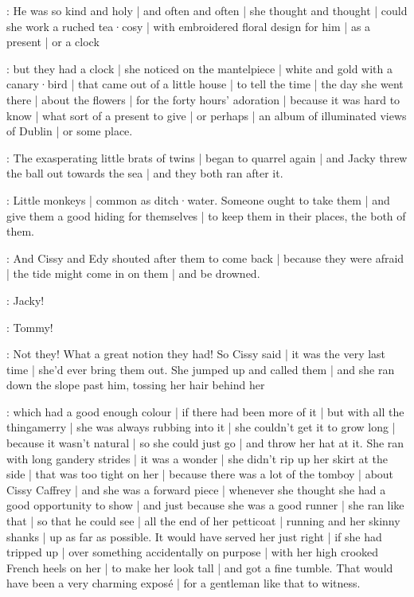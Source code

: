\gertyRomantic:
He was so kind and holy |
and often and often |
she thought and thought |%
could she work a ruched tea·cosy |
with embroidered floral design for him |
as a present |
or a clock

\gertyReal:
but they had a clock |
she noticed on the mantelpiece |
white and gold with a canary·bird |
that came out of a little house |
to tell the time |
the day she went there |
about the flowers |
for the forty hours' adoration |
because it was hard to know |
what sort of a present to give |
or perhaps |
an album of illuminated views of Dublin |
or some place.

:
The exasperating little brats of twins |
began to quarrel again |
and Jacky threw the ball out towards the sea |
and they both ran after it.

\gertyJudgy:
Little monkeys |
common as ditch·water.
Someone ought to take them |
and give them a good hiding for themselves |
to keep them in their places,
the both of them.%

:
And Cissy and Edy shouted after them to come back |
because they were afraid |
the tide might come in on them |
and be drowned.

\cissy:
Jacky!

\edy:
Tommy!

:
Not they!
What a great notion
they had!
So Cissy said |
it was the very last time |
she'd ever bring them out.
She jumped up and called them |
and she ran down the slope past him,
tossing her hair behind her

\gertyJudgy:
which had a good enough colour |
if there had been more of it |
but with all the thingamerry |
she was always rubbing into it |
she couldn't get it to grow long |
because it wasn't natural |
so she could just go |
and throw her hat at it.
She ran with long gandery strides |
it was a wonder |
she didn't rip up her skirt at the side |
that was too tight on her |%
because there was a lot of the tomboy |
about Cissy Caffrey |
and she was a forward piece |
whenever she thought
she had a good opportunity to show |
and just because she was a good runner |
she ran like that |
so that he could see |
all the end of her petticoat |
running and her skinny shanks |
up as far as possible.
It would have served her just right |
if she had tripped up |
over something accidentally on purpose |
with her high crooked French heels on her |
to make her look tall |
and got a fine tumble.
That would have been
a very charming exposé |
for a gentleman like that
to witness.

